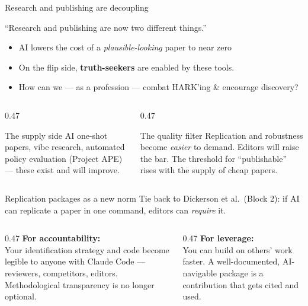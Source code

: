 \documentclass[aspectratio=169, 10pt]{beamer}
\begin{document}
\begin{frame}{Research and publishing are decoupling}
  \begin{center}
    {\large ``Research and publishing are now two different things.''}
  \end{center}
  \vspace{0.5em}
  \begin{itemize}
    \setlength{\itemsep}{0.4em}
    \item AI lowers the cost of a \textit{plausible-looking} paper to near zero
    \item On the flip side, \textbf{truth-seekers} are enabled by these tools.
     \item How can we --- as a profession --- combat HARK'ing \& encourage discovery?
  \end{itemize}
  \vspace{0.4em}
  \begin{columns}[T]
    \begin{column}{0.47\textwidth}
      \begin{block}{The supply side}
        \small AI one-shot papers, vibe research, automated policy evaluation
        (Project APE) --- these exist and will improve.
      \end{block}
    \end{column}
    \begin{column}{0.47\textwidth}
      \begin{alertblock}{The quality filter}
        \small Replication and robustness become \textit{easier} to demand.
        Editors will raise the bar.
        The threshold for ``publishable'' rises with the supply of cheap papers.
      \end{alertblock}
    \end{column}
  \end{columns}
\end{frame}

\begin{frame}{Replication packages as a new norm}
  Tie back to Dickerson et al.\ (Block 2):
  if AI can replicate a paper in one command, editors can \textit{require} it.

  \vspace{0.5em}
  \begin{columns}[T]
    \begin{column}{0.47\textwidth}
      \textbf{For accountability:}\\
      \small Your identification strategy and code become legible to anyone
      with Claude Code --- reviewers, competitors, editors.
      Methodological transparency is no longer optional.
    \end{column}
    \begin{column}{0.47\textwidth}
      \textbf{For leverage:}\\
      \small You can build on others' work faster.
      A well-documented, AI-navigable package is a contribution that gets
      cited and used.\\[0.4em]
    \end{column}
  \end{columns}
\end{frame}
\end{document}
